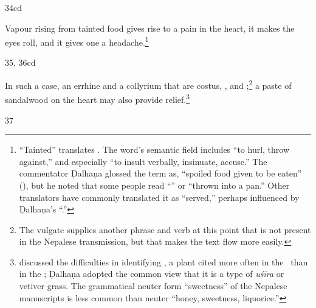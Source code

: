 \begin{translation}
\item[34cd]

Vapour rising from tainted food gives rise to a pain in the 
heart,
it makes the eyes roll, and it gives one a headache.\footnote{ “Tainted” translates
.  The word's semantic field includes “to hurl, throw against,” and
especially “to insult verbally, insinuate, accuse.”  The commentator Ḍalhaṇa
glossed the term as, “spoiled food given to be eaten” (), but he noted that some people read “” or
“thrown into a pan.”  Other translators have commonly translated it as “served,” perhaps
influenced by Ḍalhaṇa's “.”}


\item[35, 36cd] 

In such a case, an errhine and a collyrium that are costus, ,  and ;\footnote{The vulgate 
    supplies another phrase and verb at this point that is not present in the Nepalese 
    transmission, but that makes the text flow more easily.}  a paste of sandalwood
on the heart may also provide relief.\footnote{\citet[350]{sing-1972} discussed
the difficulties in identifying , a plant cited more often in the
\SS\ than in the \CS; Ḍalhaṇa adopted the common view that it is a type of \emph{uśīra} or 
vetiver grass.  The grammatical neuter form 
  “sweetness” of the Nepalese
manuscripts is less common than neuter  “honey, sweetness,
liquorice.”}

\item[37]


\end{translation}
